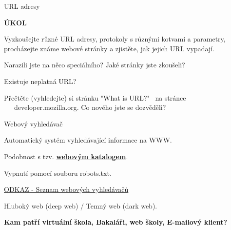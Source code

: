 \documentclass[aspectratio=1610]{beamer}
\begin{document}
\begin{frame}{URL adresy}
    \begin{cardTiny}
        \begin{center}
            \textbf{ÚKOL}
        \end{center}
        \begin{flushleft}
            Vyzkoušejte různé URL adresy, protokoly s různými kotvami a parametry, procházejte známe webové stránky a zjistěte, jak jejich URL vypadají.

            \vspace{2ex}            
            Narazili jste na něco speciálního? Jaké stránky jste zkoušeli?

            Existuje neplatná URL?

            Přečtěte (vyhledejte) si stránku "What is URL?"~ na stránce \\~~~developer.mozilla.org. Co nového jste se dozvěděli?
        \end{flushleft}
    \end{cardTiny}
\end{frame}

\begin{frame}{Webový vyhledávač}
    \begin{cardTiny}
        \begin{flushleft}
            Automatický systém vyhledávající informace na WWW.

            Podobnost s tzv. \href{https://odkazy.seznam.cz}{\textbf{webovým katalogem}}.

            Vypnutí pomocí souboru robots.txt.

            \href{https://en.wikipedia.org/wiki/List\_of\_search\_engines}{ODKAZ - Seznam webových vyhledávačů}

            Hluboký web (deep web) / Temný web (dark web).
        \end{flushleft}
    \end{cardTiny}
    \begin{cardTiny}
        \begin{center}
            \textbf{Kam patří virtuální škola, Bakaláři, web školy, E-mailový klient?}
        \end{center}
    \end{cardTiny}
\end{frame}
\end{document}
